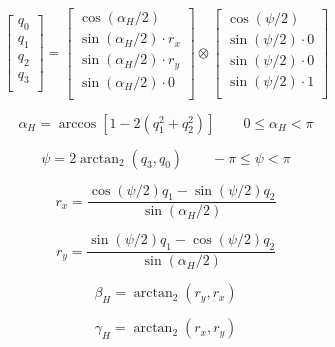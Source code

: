 \documentclass{article}
\numberwithin{equation}{section} %
\begin{document}
\begin{equation}
	\begin{bmatrix}
		q_0 \\
		q_1 \\
		q_2 \\
		q_3 \\
	\end{bmatrix}
	=
	\begin{bmatrix}
		\cos \left( \alpha_H / 2 \right) \\
		\sin \left( \alpha_H / 2 \right) \cdot r_x \\
		\sin \left( \alpha_H / 2 \right) \cdot r_y \\
		\sin \left( \alpha_H / 2 \right) \cdot 0 \\
	\end{bmatrix}
	\otimes
	\begin{bmatrix}
		\cos \left( \psi / 2 \right) \\
		\sin \left( \psi / 2 \right) \cdot 0 \\
		\sin \left( \psi / 2 \right) \cdot 0 \\
		\sin \left( \psi / 2 \right) \cdot 1 \\
	\end{bmatrix}
\end{equation}

\begin{equation}
	\alpha_H = \arccos \left[1 - 2 \left( q_1^2 + q_2^2 \right) \right]	\qquad 0 \leq \alpha_H < \pi	
\end{equation}

\begin{equation}
	\psi = 2 \arctan_2 \left( q_3, q_0 \right) \qquad -\pi \leq \psi < \pi
\end{equation}

\begin{equation}
	r_x =   \frac{\cos \left( \psi / 2 \right) q_1 - \sin \left( \psi / 2 \right) q_2}
	{ \sin \left( \alpha_H / 2 \right) }
\end{equation}

\begin{equation}
	r_y =   \frac{\sin \left( \psi / 2 \right) q_1 - \cos \left( \psi / 2 \right) q_2}
	{ \sin \left( \alpha_H / 2 \right) }
\end{equation}

\begin{equation}
	\beta_H = \arctan_2 \left(r_y, r_x \right)
\end{equation}

\begin{equation}
	\gamma_H = \arctan_2 \left(r_x, r_y \right)
\end{equation}
\end{document}
